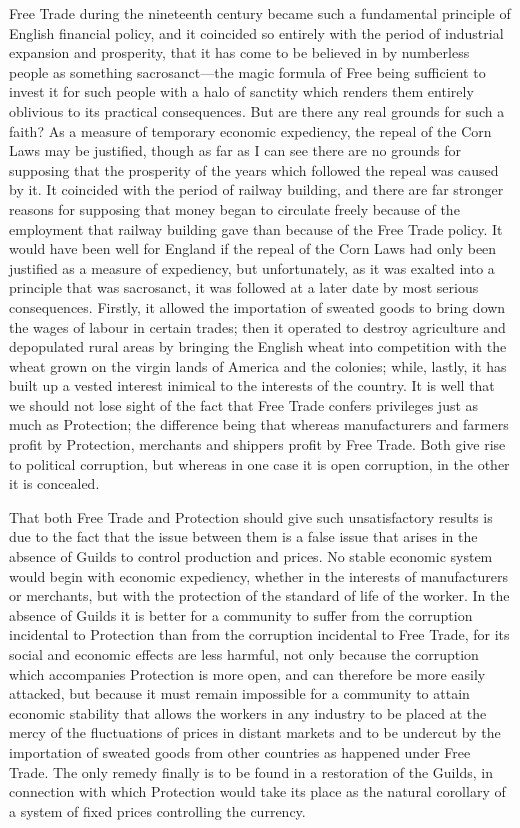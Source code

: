 \documentclass{book}
\begin{document}
Free Trade during the nineteenth century became such a fundamental principle of English financial policy, and it coincided so entirely with the period of industrial expansion and prosperity, that it has come to be believed in by numberless people as something sacrosanct—the magic formula of Free being sufficient to invest it for such people with a halo of sanctity which renders them entirely oblivious to its practical consequences. But are there any real grounds for such a faith? As a measure of temporary economic expediency, the repeal of the Corn Laws may be justified, though as far as I can see there are no grounds for supposing that the prosperity of the years which followed the repeal was caused by it. It coincided with the period of railway building, and there are far stronger reasons for supposing that money began to circulate freely because of the employment that railway building gave than because of the Free Trade policy. It would have been well for England if the repeal of the Corn Laws had only been justified as a measure of expediency, but unfortunately, as it was exalted into a principle that was sacrosanct, it was followed at a later date by most serious consequences. Firstly, it allowed the importation of sweated goods to bring down the wages of labour in certain trades; then it operated to destroy agriculture and depopulated rural areas by bringing the English wheat into competition with the wheat grown on the virgin lands of America and the colonies; while, lastly, it has built up a vested interest inimical to the interests of the country. It is well that we should not lose sight of the fact that Free Trade confers privileges just as much as Protection; the difference being that whereas manufacturers and farmers profit by Protection, merchants and shippers profit by Free Trade. Both give rise to political corruption, but whereas in one case it is open corruption, in the other it is concealed.

That both Free Trade and Protection should give such unsatisfactory results is due to the fact that the issue between them is a false issue that arises in the absence of Guilds to control production and prices. No stable economic system would begin with economic expediency, whether in the interests of manufacturers or merchants, but with the protection of the standard of life of the worker. In the absence of Guilds it is better for a community to suffer from the corruption incidental to Protection than from the corruption incidental to Free Trade, for its social and economic effects are less harmful, not only because the corruption which accompanies Protection is more open, and can therefore be more easily attacked, but because it must remain impossible for a community to attain economic stability that allows the workers in any industry to be placed at the mercy of the fluctuations of prices in distant markets and to be undercut by the importation of sweated goods from other countries as happened under Free Trade. The only remedy finally is to be found in a restoration of the Guilds, in connection with which Protection would take its place as the natural corollary of a system of fixed prices controlling the currency.
\end{document}
